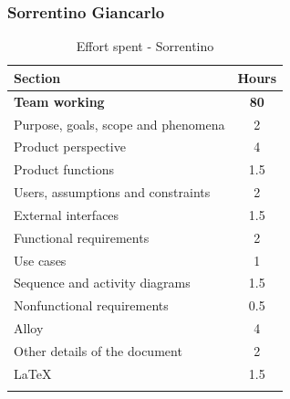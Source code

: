 \documentclass[a4paper,oneside,11pt]{book}   %
\begin{document}
    \subsubsection{Sorrentino Giancarlo}
    \begin{longtable}[c]{|V{.55\textwidth}|c|}
        \hline
        \textbf{Section} & {\bfseries{Hours}} \\ \hline
        \textbf{Team working} & \textbf{80} \\ \hline
        Purpose, goals, scope and phenomena & 2 \\ \hline
        Product perspective & 4 \\ \hline
        Product functions & 1.5 \\ \hline
        Users, assumptions and constraints & 2 \\ \hline
        External interfaces & 1.5 \\ \hline
        Functional requirements & 2 \\ \hline
        Use cases & 1 \\ \hline
        Sequence and activity diagrams & 1.5 \\ \hline
        Nonfunctional requirements & 0.5 \\ \hline
        Alloy & 4 \\ \hline
        Other details of the document & 2 \\ \hline
        \LaTeX & 1.5 \\
        \hline
        \caption{Effort spent - Sorrentino}
        \label{table:effort_sorrentino}
    \end{longtable}
    
\end{document}
